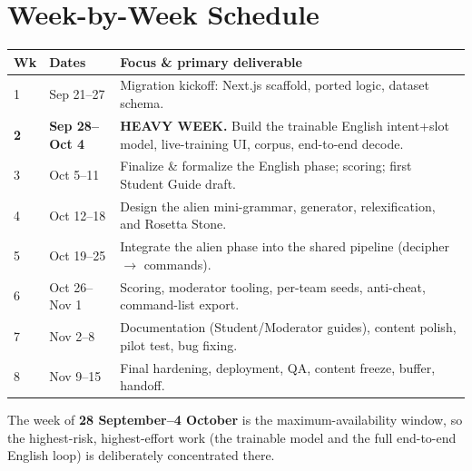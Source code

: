 \documentclass[a4]{article}
\begin{document}
\section{Week-by-Week Schedule}

\begin{center}
\renewcommand{\arraystretch}{1.35}
\begin{tabularx}{\linewidth}{@{}p{1.1cm}p{2.6cm}X@{}}
\toprule
\textbf{Wk} & \textbf{Dates} & \textbf{Focus \& primary deliverable} \\
\midrule
\cellcolor{phase0}1 & Sep 21--27 & Migration kickoff: Next.js scaffold, ported logic, dataset schema. \\
\cellcolor{heavyweek}\textbf{2} & \textbf{Sep 28--Oct 4} & \textbf{HEAVY WEEK.} Build the trainable English intent+slot model, live-training UI, corpus, end-to-end decode. \\
\cellcolor{phase1}3 & Oct 5--11 & Finalize \& formalize the English phase; scoring; first Student Guide draft. \\
\cellcolor{phase2}4 & Oct 12--18 & Design the alien mini-grammar, generator, relexification, and Rosetta Stone. \\
\cellcolor{phase2}5 & Oct 19--25 & Integrate the alien phase into the shared pipeline (decipher $\rightarrow$ commands). \\
\cellcolor{phase2}6 & Oct 26--Nov 1 & Scoring, moderator tooling, per-team seeds, anti-cheat, command-list export. \\
\cellcolor{bufferc}7 & Nov 2--8 & Documentation (Student/Moderator guides), content polish, pilot test, bug fixing. \\
\cellcolor{bufferc}8 & Nov 9--15 & Final hardening, deployment, QA, content freeze, buffer, handoff. \\
\bottomrule
\end{tabularx}
\end{center}

\noindent The week of \textbf{28 September--4 October} is the maximum-availability
window, so the highest-risk, highest-effort work (the trainable model and the
full end-to-end English loop) is deliberately concentrated there.
\end{document}
